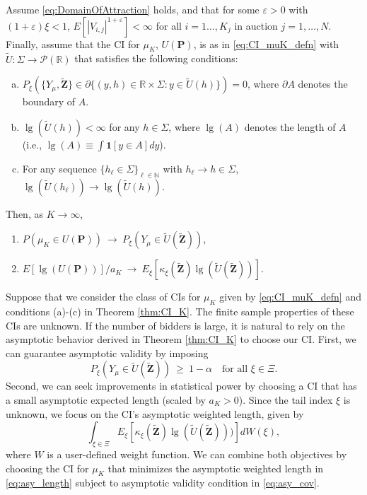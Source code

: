 \begin{theorem} \label{thm:CI_K} 
Assume \eqref{eq:DomainOfAttraction} holds, and that for some $\varepsilon >0$ with $(1+\varepsilon)\xi<1$, $E[|V_{i,j}|^{1+\varepsilon}]<\infty $ for all $i=1\dots,K_j$ in auction $j=1,\dots,N$. Finally, assume that the CI for $\mu _{K}$, $U(\mathbf{P})$, is as in \eqref{eq:CI_muK_defn} with $\tilde{U}:\Sigma\to \mathcal{P}(\mathbb{R}) $ that satisfies the following conditions:
\begin{enumerate}[(a)]
\item $P_{\xi}(\{Y_{\mu },\mathbf{\tilde{Z}}\}\in \partial \{(y,h)\in \mathbb{R} \times \Sigma:y\in \tilde{U}(h)\})=0$, where $\partial A$ denotes the boundary of $A$.%
\item $\lg (\tilde{U}(h))<\infty $ for any $h\in \Sigma$, where $ \lg (A)$ denotes the length of $A$ (i.e., $\lg (A)\equiv \int \mathbf{1} [y\in A]dy$).
\item For any sequence $\{h_{\ell}\in \Sigma\}_{\ell\in \mathbb{N}}$ with $ h_{\ell}\to h\in \Sigma$, $\lg (\tilde{U}(h_{\ell}))\to \lg (\tilde{U}(h))$.
\end{enumerate}
Then, as $K\to \infty $,
\begin{enumerate}
\item $P(\mu _{K}\in U(\mathbf{P}))~\to ~P_{\xi }(Y_{\mu }\in \tilde{ U}(\mathbf{\tilde{Z}}))$,
\item $E[\lg (U(\mathbf{P}))]/a_{K}~\to ~E_{\xi }[\kappa _{\xi }( \mathbf{\tilde{Z}})\lg (\tilde{U}(\mathbf{\tilde{Z}}))]$.
\end{enumerate}
\end{theorem}

Suppose that we consider the class of CIs for $\mu_K$ given by \eqref{eq:CI_muK_defn} and conditions (a)-(c) in Theorem \ref{thm:CI_K}. The finite sample properties of these CIs are unknown. If the number of bidders is large, it is natural to rely on the asymptotic behavior derived in Theorem \ref{thm:CI_K} to choose our CI. First, we can guarantee asymptotic validity by imposing
\begin{equation}
P_{\xi }( Y_{\mu }\in \tilde{ U}(\mathbf{\tilde{Z}})) ~\geq~ 1-\alpha ~~~\text{ for all }\xi \in \Xi .  \label{eq:asy_cov}
\end{equation}
Second, we can seek improvements in statistical power by choosing a CI that has a small asymptotic expected length (scaled by $a_{K}>0$). Since the tail index $\xi$ is unknown, we focus on the CI's asymptotic weighted length, given by
\begin{equation}
\int_{\xi \in \Xi} E_{\xi }[ \kappa _{\xi }(\tilde{\mathbf{{Z}}})\lg (\tilde U(\tilde{\mathbf{{Z}}})))] dW(\xi ),  \label{eq:asy_length}
\end{equation}
where $W$ is a user-defined weight function. We can combine both objectives by choosing the CI for $\mu_K$ that minimizes the asymptotic weighted length in \eqref{eq:asy_length} subject to asymptotic validity condition in \eqref{eq:asy_cov}. 

